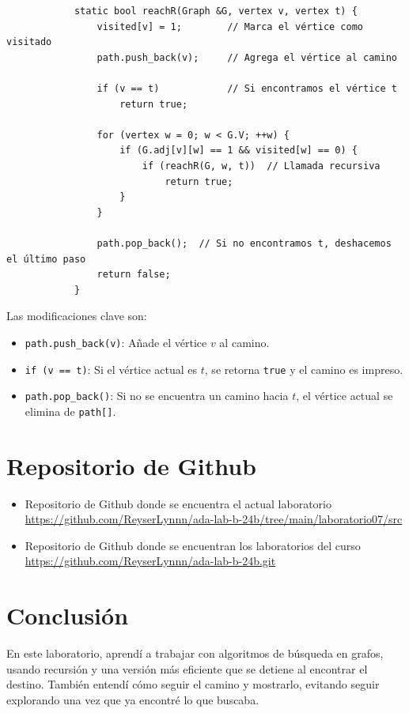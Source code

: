\documentclass{article}
\begin{document}
            \begin{verbatim}
            static bool reachR(Graph &G, vertex v, vertex t) {
                visited[v] = 1;        // Marca el vértice como visitado
                path.push_back(v);     // Agrega el vértice al camino
            
                if (v == t)            // Si encontramos el vértice t
                    return true;
            
                for (vertex w = 0; w < G.V; ++w) {
                    if (G.adj[v][w] == 1 && visited[w] == 0) {
                        if (reachR(G, w, t))  // Llamada recursiva
                            return true;
                    }
                }
            
                path.pop_back();  // Si no encontramos t, deshacemos el último paso
                return false;
            }
            \end{verbatim}

        Las modificaciones clave son:
            \begin{itemize}
                \item \texttt{path.push\_back(v)}: Añade el vértice \( v \) al camino.
                \item \texttt{if (v == t)}: Si el vértice actual es \( t \), se retorna \texttt{true} y el camino es impreso.
                \item \texttt{path.pop\_back()}: Si no se encuentra un camino hacia \( t \), el vértice actual se elimina de \texttt{path[]}.
            \end{itemize}
 
\section{Repositorio de Github}
	\begin{itemize}
		\item Repositorio de Github donde se encuentra el actual laboratorio \\
		\url{https://github.com/ReyserLynnn/ada-lab-b-24b/tree/main/laboratorio07/src}

        \item Repositorio de Github donde se encuentran los laboratorios del curso\\
		\url{https://github.com/ReyserLynnn/ada-lab-b-24b.git}
	\end{itemize}

\section{Conclusión}
En este laboratorio, aprendí a trabajar con algoritmos de búsqueda en grafos, usando recursión y una versión más eficiente que se detiene al encontrar el destino. También entendí cómo seguir el camino y mostrarlo, evitando seguir explorando una vez que ya encontré lo que buscaba.
    

\end{document}

